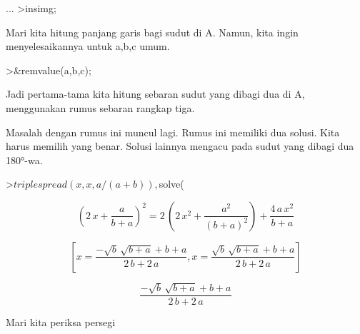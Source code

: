 \documentclass[a4paper,10pt]{article}
\begin{document}
\begin{eulernotebook}
\begin{eulercomment}
\begin{eulercomment}
\begin{eulercomment}
\begin{eulercomment}
\begin{eulercomment}
\begin{eulercomment}
\begin{eulercomment}
\begin{eulercomment}
\begin{eulercomment}
\begin{eulercomment}
\begin{eulercomment}
\begin{eulercomment}
\begin{eulercomment}
\begin{eulercomment}
\begin{eulercomment}
\begin{eulercomment}
\begin{eulercomment}
\begin{eulercomment}
\begin{eulercomment}
\begin{eulercomment}
\begin{eulercomment}
\begin{eulercomment}
\begin{eulercomment}
\begin{eulercomment}
\begin{eulercomment}
\begin{eulercomment}
\begin{eulercomment}
\begin{eulercomment}
\begin{eulercomment}
\begin{eulercomment}
\begin{eulercomment}
\begin{eulercomment}
\begin{eulercomment}
\begin{eulercomment}
\begin{eulercomment}
\begin{eulercomment}
\begin{eulercomment}
\begin{eulercomment}
\begin{eulercomment}
\begin{eulercomment}
\begin{eulercomment}
\begin{eulercomment}
\begin{eulercomment}
\begin{eulercomment}
\begin{eulercomment}
\begin{eulercomment}
\begin{eulercomment}
\begin{eulercomment}
\begin{eulercomment}
\begin{eulercomment}
\begin{eulercomment}
\begin{eulercomment}
\begin{eulercomment}
\begin{eulercomment}
\begin{eulercomment}
\begin{eulercomment}
\begin{eulercomment}
\begin{eulercomment}
\begin{eulercomment}
\begin{eulercomment}
\begin{eulercomment}
\begin{eulercomment}
\begin{eulerprompt}
...
>insimg;
\end{eulerprompt}
\begin{eulercomment}
Mari kita hitung panjang garis bagi sudut di A. Namun, kita ingin
menyelesaikannya untuk a,b,c umum.
\end{eulercomment}
\begin{eulerprompt}
>&remvalue(a,b,c);
\end{eulerprompt}
\begin{eulercomment}
Jadi pertama-tama kita hitung sebaran sudut yang dibagi dua di A,
menggunakan rumus sebaran rangkap tiga.

Masalah dengan rumus ini muncul lagi. Rumus ini memiliki dua solusi.
Kita harus memilih yang benar. Solusi lainnya mengacu pada sudut yang
dibagi dua 180°-wa.
\end{eulercomment}
\begin{eulerprompt}
>$triplespread(x,x,a/(a+b)), $solve(%
\end{eulerprompt}
\begin{eulerformula}
\[
\left(2\,x+\frac{a}{b+a}\right)^2=2\,\left(2\,x^2+\frac{a^2}{\left(
 b+a\right)^2}\right)+\frac{4\,a\,x^2}{b+a}
\]
\end{eulerformula}
\begin{eulerformula}
\[
\left[ x=\frac{-\sqrt{b}\,\sqrt{b+a}+b+a}{2\,b+2\,a} , x=\frac{
 \sqrt{b}\,\sqrt{b+a}+b+a}{2\,b+2\,a} \right] 
\]
\end{eulerformula}
\begin{eulerformula}
\[
\frac{-\sqrt{b}\,\sqrt{b+a}+b+a}{2\,b+2\,a}
\]
\end{eulerformula}
\begin{eulercomment}
Mari kita periksa persegi 
\end{eulercomment}
\end{eulercomment}
\end{eulercomment}
\end{eulercomment}
\end{eulercomment}
\end{eulercomment}
\end{eulercomment}
\end{eulercomment}
\end{eulercomment}
\end{eulercomment}
\end{eulercomment}
\end{eulercomment}
\end{eulercomment}
\end{eulercomment}
\end{eulercomment}
\end{eulercomment}
\end{eulercomment}
\end{eulercomment}
\end{eulercomment}
\end{eulercomment}
\end{eulercomment}
\end{eulercomment}
\end{eulercomment}
\end{eulercomment}
\end{eulercomment}
\end{eulercomment}
\end{eulercomment}
\end{eulercomment}
\end{eulercomment}
\end{eulercomment}
\end{eulercomment}
\end{eulercomment}
\end{eulercomment}
\end{eulercomment}
\end{eulercomment}
\end{eulercomment}
\end{eulercomment}
\end{eulercomment}
\end{eulercomment}
\end{eulercomment}
\end{eulercomment}
\end{eulercomment}
\end{eulercomment}
\end{eulercomment}
\end{eulercomment}
\end{eulercomment}
\end{eulercomment}
\end{eulercomment}
\end{eulercomment}
\end{eulercomment}
\end{eulercomment}
\end{eulercomment}
\end{eulercomment}
\end{eulercomment}
\end{eulercomment}
\end{eulercomment}
\end{eulercomment}
\end{eulercomment}
\end{eulercomment}
\end{eulercomment}
\end{eulercomment}
\end{eulercomment}
\end{eulercomment}
\end{eulernotebook}
\end{document}
